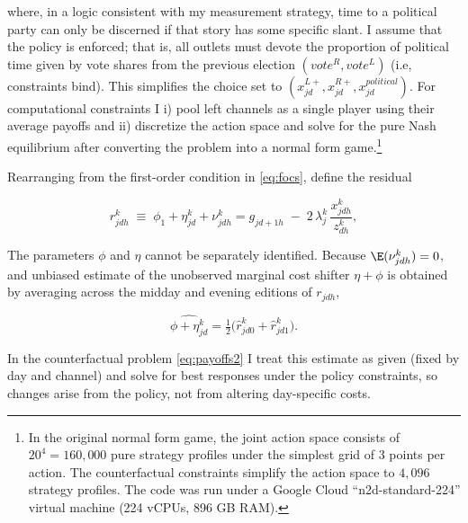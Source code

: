 \documentclass[12pt]{article}
\begin{document}
where, in a logic consistent with my measurement strategy, time to a political party can only be discerned if that story has some specific slant. I assume that the policy is enforced; that is, all outlets must devote the proportion of political time given by vote shares from the previous election $(vote^R, vote^L)$ (i.e, constraints bind). This simplifies the choice set to $\left( x_{jd}^{L+} ,x_{jd}^{R+} ,x_{jd}^{political}\right)$. For computational constraints I i) pool left channels as a single player using their average payoffs and ii) discretize the action space and solve for the pure Nash equilibrium after converting the problem into a normal form game.\footnote{ In the original normal form game, the joint action space consists of 	$20^4=160,000$  pure strategy profiles under the simplest grid of 3 points per action. The counterfactual constraints simplify the action space to $4,096$ strategy profiles.  The code was run under a Google Cloud “n2d-standard-224” virtual machine (224 vCPUs, 896 GB RAM).} 






Rearranging from the   first-order condition in \eqref{eq:focs}, define the residual

\[
r_{jdh}^k \;\equiv\;\phi_1+\eta_{jd}^k+ \nu_{jdh}^k= {{g}_{jd+1h}} \;-\; 2\,{{\lambda}}_j^k\,\frac{x_{jdh}^k}{z_{dh}^k} ,
\]


The parameters $\phi$ and $\eta$ cannot be separately identified. Because $\E(\nu_{jdh}^k)=0$, and unbiased estimate of the unobserved marginal cost shifter $\eta + \phi$ is obtained by averaging across the midday and evening editions of $r_{jdh}$,


\[
\widehat{\phi +\eta_{jd}^k} = \tfrac{1}{2}\big(\hat{r}_{jd0}^k+\hat{r}_{jd1}^k\big).
\]


In the counterfactual problem \eqref{eq:payoffs2} I treat this estimate  as given (fixed by day and channel) and solve for best responses under the policy constraints, so changes arise from the policy, not from altering day-specific costs.
\end{document}
